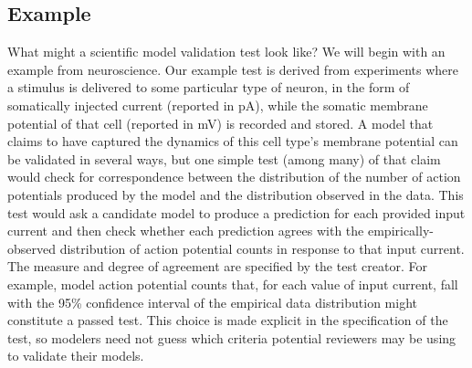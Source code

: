 \documentclass[a4paper,12pt]{article}
\begin{document}
\subsection{Example} What might a scientific model validation test look like?  We will begin with an example from neuroscience. Our example test is derived from experiments where a stimulus is delivered to some particular type of neuron, in the form of somatically injected current (reported in pA), while the somatic membrane potential of that cell (reported in mV) is recorded and stored.  A model that claims to have captured the dynamics of this cell type's membrane potential can be validated in several ways, but one simple test (among many) of that claim would check for correspondence between the distribution of the number of action potentials produced by the model and the distribution observed in the data. This test would ask a candidate model to produce a prediction for each provided input current and then check whether each prediction agrees with the empirically-observed distribution of action potential counts in response to that input current.  The measure and degree of agreement are specified by the test creator.  For example, model action potential counts that, for each value of input current, fall with the 95\% confidence interval of the empirical data distribution might constitute a passed test. This choice is made explicit in the specification of the test, so modelers need not guess which criteria potential reviewers may be using to validate their models.
\end{document}
